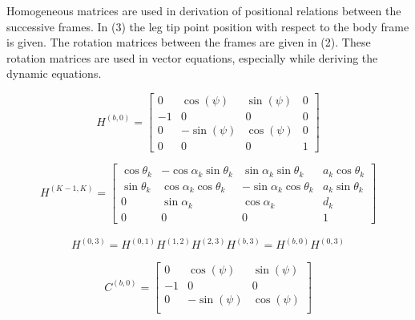 Homogeneous matrices are used in derivation of positional relations between the successive frames.  In (3) the leg tip point position with respect to the body frame is given. The rotation matrices between the frames are given in (2). These rotation matrices are used in vector equations, especially while deriving the dynamic equations.
\begin{center}

\[
H^{(b,0)}=
\begin{bmatrix}
0 & \cos(\psi) & \sin(\psi) & 0 \\
-1&		0	   & 		0 	& 0\\
0 & -\sin(\psi)& \cos(\psi) & 0 \\
0 &		0	   & 		0 	& 1
\end{bmatrix}
\]
\end{center}

\begin{equation}
H^{(K-1,K)} =
\begin{bmatrix}
\cos\theta_k &-\cos\alpha_k\sin\theta_k &\sin\alpha_k\sin\theta_k &a_k\cos\theta_k\\
\sin\theta_k &\cos\alpha_k\cos\theta_k &-\sin\alpha_k\cos\theta_k &a_k\sin\theta_k\\
0 &\sin\alpha_k &\cos\alpha_k &d_k \\ 
0 &0 &0 &1
\end{bmatrix}
\end{equation}

\begin{align*}
H^{(0,3)} = H^{(0,1)} H^{(1,2)} H^{(2,3)} H^{(b,3)}= H^{(b,0)} H^{(0,3)}
\end{align*}

\begin{center}
	
	\[
	C^{(b,0)}=
	\begin{bmatrix}
	0 & \cos(\psi) & \sin(\psi) \\
	-1&		0	   & 		0 	\\
	0 & -\sin(\psi)& \cos(\psi) \\

	\end{bmatrix}
	\]
\end{center}

